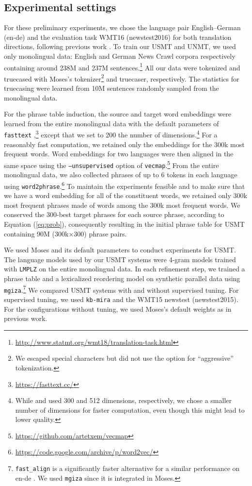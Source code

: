 \documentclass[11pt,a4paper]{article}
\newcommand{\Eq}[1]{{Equation (\ref{eq:#1})}}
\newcommand{\moses}{Moses}
\begin{document}
\subsection{Experimental settings}
\label{section:expset}
For these preliminary experiments, we chose the language pair English--German (en-de) and the evaluation task WMT16 (newstest2016) for both translation directions, following previous work \citep{artetxe2018unsupervised,DBLP:journals/corr/abs-1804-07755}. To train our USMT and UNMT, we used only monolingual data: English and German News Crawl corpora respectively containing around 238M and 237M sentences.\footnote{\url{http://www.statmt.org/wmt18/translation-task.html}}
All our data were tokenized and truecased with {\moses}'s tokenizer\footnote{We escaped special characters but did not use the option for ``aggressive'' tokenization.} and truecaser, respectively. The statistics for truecasing were learned from 10M sentences randomly sampled from the monolingual data.

For the phrase table induction, the source and target word embeddings were learned from the entire monolingual data with the default parameters of \texttt{fasttext} \citep{bojanowski2017enriching},\footnote{\url{https://fasttext.cc/}} except that we set to 200 the number of dimensions.\footnote{While \citet{artetxe2018unsupervised} and \citet{DBLP:journals/corr/abs-1804-07755} used 300 and 512 dimensions, respectively, we chose a smaller number of dimensions for faster computation, even though this might lead to lower quality.} For a reasonably fast computation, we retained only the embeddings for the 300k most frequent words. Word embeddings for two languages were then aligned in the same space using the \texttt{--unsupervised} option of \texttt{vecmap}.\footnote{\url{https://github.com/artetxem/vecmap}}  From the entire monolingual data, we also collected phrases of up to 6 tokens in each language using \texttt{word2phrase}.\footnote{\url{https://code.google.com/archive/p/word2vec/}} To maintain the experiments feasible and to make sure that we have a word embedding for all of the constituent words, we retained only 300k most frequent phrases made of words among the 300k most frequent words. We conserved the 300-best target phrases for each source phrase, according to \Eq{prob}, consequently resulting in the initial phrase table for USMT containing 90M (300k$\times$300) phrase pairs.

We used {\moses} and its default parameters to conduct experiments for USMT. The language models used by our USMT systems were 4-gram models trained with \texttt{LMPLZ} \citep{P13-2121} on the entire monolingual data.  In each refinement step, we trained a phrase table and a lexicalized reordering model on synthetic parallel data using \texttt{mgiza}.\footnote{\texttt{fast\_align} \citep{dyer-chahuneau-smith:2013:NAACL-HLT} is a significantly faster alternative for a similar performance on en-de \citep{W14-3309}. We used \texttt{mgiza} since it is integrated in {\moses}.} We compared USMT systems with and without supervised tuning. For supervised tuning, we used \texttt{kb-mira} \citep{N12-1047} and the WMT15 newstest (newstest2015). For the configurations without tuning, we used {\moses}'s default weights as in previous work.
\end{document}
